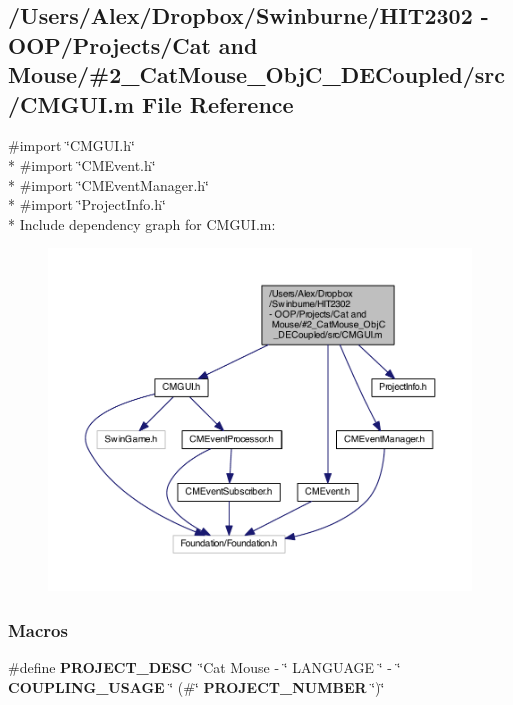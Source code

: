 \subsection{/\-Users/\-Alex/\-Dropbox/\-Swinburne/\-H\-I\-T2302 -\/ O\-O\-P/\-Projects/\-Cat and Mouse/\#2\-\_\-\-Cat\-Mouse\-\_\-\-Obj\-C\-\_\-\-D\-E\-Coupled/src/\-C\-M\-G\-U\-I.m File Reference}
\label{_c_m_g_u_i_8m}
{\ttfamily \#import \char`\"{}C\-M\-G\-U\-I.\-h\char`\"{}}\\*
{\ttfamily \#import \char`\"{}C\-M\-Event.\-h\char`\"{}}\\*
{\ttfamily \#import \char`\"{}C\-M\-Event\-Manager.\-h\char`\"{}}\\*
{\ttfamily \#import \char`\"{}Project\-Info.\-h\char`\"{}}\\*
Include dependency graph for C\-M\-G\-U\-I.\-m\-:
\nopagebreak
\begin{figure}[H]
\begin{center}
\leavevmode
\includegraphics[width=350pt]{_c_m_g_u_i_8m__incl}
\end{center}
\end{figure}
\subsubsection*{Macros}
\begin{DoxyCompactItemize}
\item 
\#define {\bf P\-R\-O\-J\-E\-C\-T\-\_\-\-D\-E\-S\-C}~\char`\"{}Cat Mouse -\/ \char`\"{} L\-A\-N\-G\-U\-A\-G\-E \char`\"{} -\/ \char`\"{} {\bf C\-O\-U\-P\-L\-I\-N\-G\-\_\-\-U\-S\-A\-G\-E} \char`\"{} (\#\char`\"{} {\bf P\-R\-O\-J\-E\-C\-T\-\_\-\-N\-U\-M\-B\-E\-R} \char`\"{})\char`\"{}
\end{DoxyCompactItemize}


